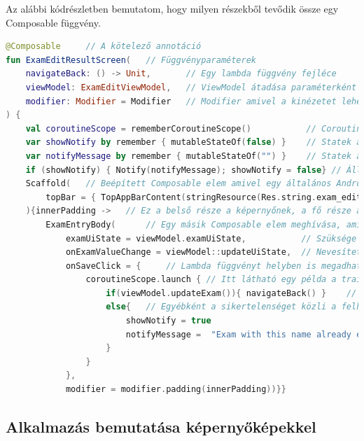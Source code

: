 Az alábbi kódrészletben bemutatom, hogy milyen részekből tevődik össze egy Composable függvény.
\begin{lstlisting}[caption={Composable függvény részei.}, label={lst:ComposableParts}, language=Kotlin]
@Composable     // A kötelező annotáció
fun ExamEditResultScreen(   // Függvényparaméterek
    navigateBack: () -> Unit,       // Egy lambda függvény fejléce
    viewModel: ExamEditViewModel,   // ViewModel átadása paraméterként
    modifier: Modifier = Modifier   // Modifier amivel a kinézetet lehet testre szabdni.
) {
    val coroutineScope = rememberCoroutineScope()           // Coroutine scope lekérése, így lambda függvényben használható, mivel annak a törzse nem Composable függvény.
    var showNotify by remember { mutableStateOf(false) }    // Statek amit el lehet tárolni a Composable függvényben mivel ezen kívül nincs használva.
    var notifyMessage by remember { mutableStateOf("") }    // Statek amit el lehet tárolni a Composable függvényben mivel ezen kívül nincs használva.
    if (showNotify) { Notify(notifyMessage); showNotify = false} // Állapottól függő megjelenítés
    Scaffold(   // Beépített Composable elem amivel egy általános Android nézetet könnyen létre lehet hozni.
        topBar = { TopAppBarContent(stringResource(Res.string.exam_edit), navigateBack) },  // Itt egy topBart lehet könnyen megadni.
    ){innerPadding ->   // Ez a belső része a képernyőnek, a fő része az alkalmazásnak.
        ExamEntryBody(      // Egy másik Composable elem meghívása, ami a megjelenésért felel.
            examUiState = viewModel.examUiState,           // Szüksége van viewModelben lévő statere
            onExamValueChange = viewModel::updateUiState,  // Nevesített függvényt így lehet átadni egy lambda függvénynek
            onSaveClick = {     // Lambda függvényt helyben is megadhatunk
                coroutineScope.launch { // Itt látható egy példa a trailing lambda használatára
                    if(viewModel.updateExam()){ navigateBack() }    // If-else szerkezet is nyugodtan használhatunk. Siker esetén visszanavigál
                    else{   // Egyébként a sikertelenséget közli a felhasználóval
                        showNotify = true
                        notifyMessage =  "Exam with this name already exists"
                    }
                }
            },
            modifier = modifier.padding(innerPadding))}}
\end{lstlisting}

\subsection{Alkalmazás bemutatása képernyőképekkel}

